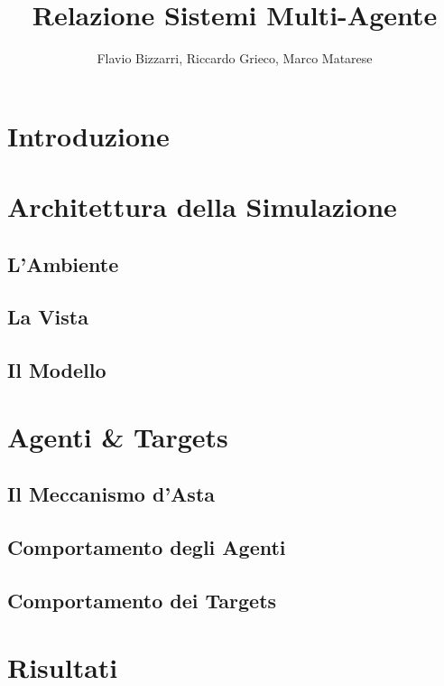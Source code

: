 \documentclass[12pt]{article}
\title{Relazione Sistemi Multi-Agente}
\author{Flavio Bizzarri, Riccardo Grieco, Marco Matarese}
\begin{document}

\newpage

\tableofcontents

\newpage

\section{Introduzione}


\newpage

\section{Architettura della Simulazione}
	\subsection{L'Ambiente}
	
	\subsection{La Vista}
	
	\subsection{Il Modello}
	
	
	\newpage

\section{Agenti \& Targets}
	
	\subsection{Il Meccanismo d'Asta}
	\subsection{Comportamento degli Agenti}
	
	\subsection{Comportamento dei Targets}
	
	
	\newpage
	
\section{Risultati}
\end{document}
